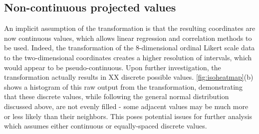 \subsection{Non-continuous projected values}
An implicit assumption of the transformation is that the resulting coordinates are now continuous values, which allows linear regression and correlation methods to be used. Indeed, the transformation of the 8-dimensional ordinal Likert scale data to the two-dimensional coordinates creates a higher resolution of intervals, which would appear to be pseudo-continuous. Upon further investigation, the transformation actually results in XX discrete possible values. \autoref{fig:isoheatmap}(b) shows a histogram of this raw output from the transformation, demonstrating that these discrete values, while following the general normal distribution discussed above, are not evenly filled - some adjacent values may be much more or less likely than their neighbors. This poses potential issues for further analysis which assumes either continuous or equally-spaced discrete values.
